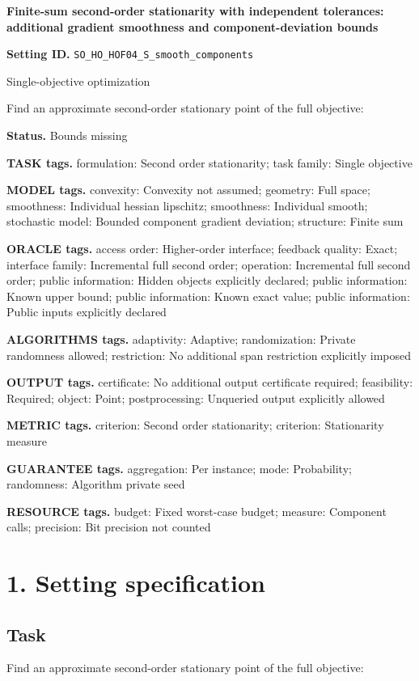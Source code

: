\documentclass[10pt,a4paper]{article}
\begin{document}
\raggedright

{\LARGE\bfseries\sffamily\color{AtlasNavy} Finite-sum second-order stationarity with independent tolerances: additional gradient smoothness and component-deviation bounds\par}\vspace{5pt}
\textbf{Setting ID.} \texttt{SO\_\allowbreak{}HO\_\allowbreak{}HOF04\_\allowbreak{}S\_\allowbreak{}smooth\_\allowbreak{}components}

Single-objective optimization

Find an approximate second-order stationary point of the full objective:

\textbf{Status.} Bounds missing

\textbf{TASK tags.} formulation: Second order stationarity; task family: Single objective

\textbf{MODEL tags.} convexity: Convexity not assumed; geometry: Full space; smoothness: Individual hessian lipschitz; smoothness: Individual smooth; stochastic model: Bounded component gradient deviation; structure: Finite sum

\textbf{ORACLE tags.} access order: Higher-order interface; feedback quality: Exact; interface family: Incremental full second order; operation: Incremental full second order; public information: Hidden objects explicitly declared; public information: Known upper bound; public information: Known exact value; public information: Public inputs explicitly declared

\textbf{ALGORITHMS tags.} adaptivity: Adaptive; randomization: Private randomness allowed; restriction: No additional span restriction explicitly imposed

\textbf{OUTPUT tags.} certificate: No additional output certificate required; feasibility: Required; object: Point; postprocessing: Unqueried output explicitly allowed

\textbf{METRIC tags.} criterion: Second order stationarity; criterion: Stationarity measure

\textbf{GUARANTEE tags.} aggregation: Per instance; mode: Probability; randomness: Algorithm private seed

\textbf{RESOURCE tags.} budget: Fixed worst-case budget; measure: Component calls; precision: Bit precision not counted

\section{1. Setting specification}
\subsection{Task}
Find an approximate second-order stationary point of the full objective:
\end{document}
